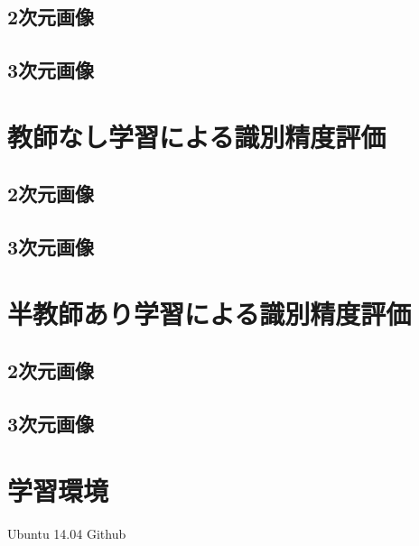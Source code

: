\subsection*{2次元画像}
\subsection*{3次元画像}

\section{教師なし学習による識別精度評価}
\subsection*{2次元画像}
\subsection*{3次元画像}

\section{半教師あり学習による識別精度評価}
\subsection*{2次元画像}
\subsection*{3次元画像}

\section{学習環境}
Ubuntu 14.04
Github
